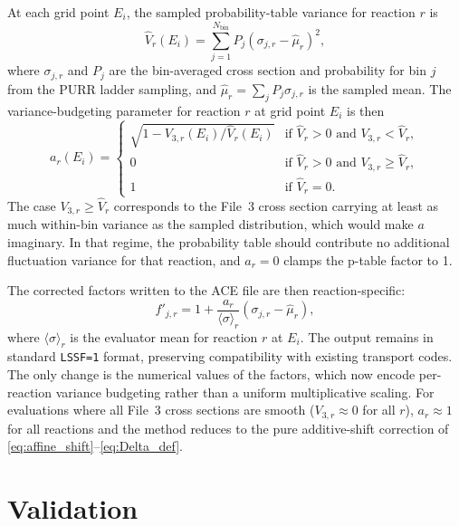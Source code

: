 \documentclass{style/nseJournal}
\newcommand{\sbin}{\langle \sigma \rangle}
\begin{document}
At each grid point $E_i$, the sampled probability-table variance for reaction $r$ is
\begin{equation}
\hat{V}_r(E_i) = \sum_{j=1}^{N_{\text{bin}}} P_j\left(\sigma_{j,r} - \hat{\mu}_r\right)^2,
\label{eq:ptable-var-reaction}
\end{equation}
where $\sigma_{j,r}$ and $P_j$ are the bin-averaged cross section and probability for bin $j$ from the PURR ladder sampling, and $\hat{\mu}_r = \sum_j P_j \sigma_{j,r}$ is the sampled mean. The variance-budgeting parameter for reaction $r$ at grid point $E_i$ is then
\begin{equation}
a_r(E_i) = \begin{cases}
\sqrt{1 - V_{3,r}(E_i)/\hat{V}_r(E_i)} & \text{if } \hat{V}_r > 0 \text{ and } V_{3,r} < \hat{V}_r, \\
0 & \text{if } \hat{V}_r > 0 \text{ and } V_{3,r} \ge \hat{V}_r, \\
1 & \text{if } \hat{V}_r = 0.
\end{cases}
\label{eq:a-per-reaction}
\end{equation}
The case $V_{3,r} \ge \hat{V}_r$ corresponds to the File~3 cross section carrying at least as much within-bin variance as the sampled distribution, which would make $a$ imaginary. In that regime, the probability table should contribute no additional fluctuation variance for that reaction, and $a_r = 0$ clamps the p-table factor to 1.

The corrected factors written to the ACE file are then reaction-specific:
\begin{equation}
f'_{j,r} = 1 + \frac{a_r}{\sbin_r}\left(\sigma_{j,r} - \hat{\mu}_r\right),
\label{eq:factor-per-reaction}
\end{equation}
where $\sbin_r$ is the evaluator mean for reaction $r$ at $E_i$. The output remains in standard \texttt{LSSF=1} format, preserving compatibility with existing transport codes. The only change is the numerical values of the factors, which now encode per-reaction variance budgeting rather than a uniform multiplicative scaling. For evaluations where all File~3 cross sections are smooth ($V_{3,r} \approx 0$ for all $r$), $a_r \approx 1$ for all reactions and the method reduces to the pure additive-shift correction of \autoref{eq:affine_shift}--\autoref{eq:Delta_def}.

\section{Validation}
\label{sec:validation}
\end{document}
